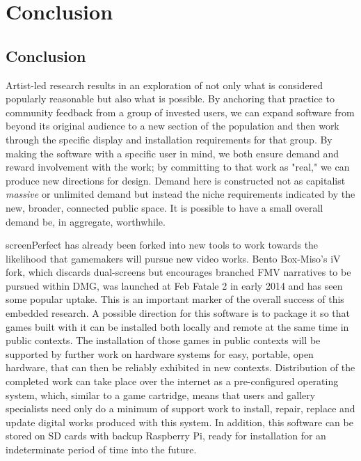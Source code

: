 
\chapter{Conclusion}\thispagestyle{empty} %

\label{Chapter5} %


\section{Conclusion}

Artist-led research results in an exploration of not only what is considered popularly reasonable but also what is possible. By anchoring that practice to community feedback from a group of invested users, we can expand software from beyond its original audience to a new section of the population and then work through the specific display and installation requirements for that group. By making the software with a specific user in mind, we both ensure demand and reward involvement with the work; by committing to that work as "real," we can produce new directions for design. Demand here is constructed not as capitalist \textit{massive} or unlimited demand but instead the niche requirements indicated by the new, broader, connected public space. It is possible to have a small overall demand be, in aggregate, worthwhile.

screenPerfect has already been forked into new tools to work towards the likelihood that gamemakers will pursue new video works. Bento Box-Miso's iV fork, which discards dual-screens but encourages branched FMV narratives to be pursued within DMG, was launched at Feb Fatale 2 in early 2014 and has seen some popular uptake. This is an important marker of the overall success of this embedded research. A possible direction for this software is to package it so that games built with it can be installed both locally and remote at the same time in public contexts. The installation of those games in public contexts will be supported by further work on hardware systems for easy, portable, open hardware, that can then be reliably exhibited in new contexts. Distribution of the completed work can take place over the internet as a pre-configured operating system, which, similar to a game cartridge, means that users and gallery specialists need only do a minimum of support work to install, repair, replace and update digital works produced with this system. In addition, this software can be stored on SD cards with backup Raspberry Pi, ready for installation for an indeterminate period of time into the future.

